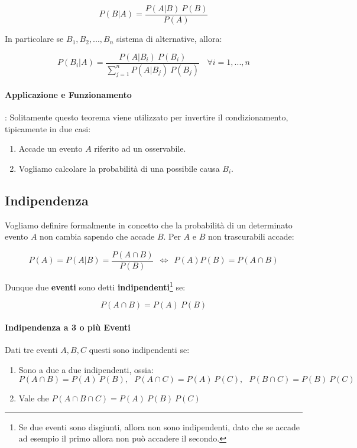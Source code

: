 \documentclass{article}
\begin{document}
\[ P(B|A) = \frac{P(A|B)\:P(B)}{P(A)} \]

In particolare se $B_{1}, B_{2}, ..., B_{n}$ sistema di alternative, allora:

\[ P(B_{i}|A) = \frac{P(A|B_{i})\:P(B_{i})}{\sum_{j=1}^{n} P(A|B_{j})\:P(B_{j}) } \:\:\:\: \forall i = 1, ..., n \]

\paragraph{Applicazione e Funzionamento}: Solitamente questo teorema viene utilizzato per invertire il condizionamento, tipicamente in due casi:

\begin{enumerate}
    \item Accade un evento $A$ riferito ad un osservabile.
    \item Vogliamo calcolare la probabilità di una possibile causa $B_{i}$.
\end{enumerate}

\subsection{Indipendenza}

Vogliamo definire formalmente in concetto che la probabilità di un determinato evento $A$ non cambia sapendo che accade $B$. Per $A$ e $B$ non trascurabili accade:

\[ P(A) = P(A|B) = \frac{P(A \cap B)}{P(B)} \: \: \Longleftrightarrow \: \: P(A) P(B) = P(A \cap B) \]

Dunque due \textbf{eventi} sono detti \textbf{indipendenti}\footnote{Se due eventi sono disgiunti, allora non sono indipendenti, dato che se accade ad esempio il primo allora non può accadere il secondo.} se:

\[ P(A \cap B) = P(A) \: P(B) \]

\paragraph{Indipendenza a 3 o più Eventi} Dati tre eventi $A,B,C$ questi sono indipendenti se:

\begin{enumerate}
    \item Sono a due a due indipendenti, ossia:
        \[ P(A \cap B) = P(A) \: P(B) ,\:\:\: P(A \cap C) = P(A) \: P(C), \:\:\: P(B \cap C) = P(B) \: P(C) \]
    \item Vale che $P(A \cap B \cap C) = P(A) \: P(B) \: P(C) $
\end{enumerate}
\end{document}
